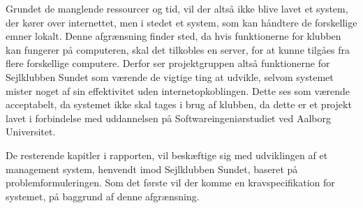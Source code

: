 Grundet de manglende ressourcer og tid, vil der altså ikke blive lavet et system, der kører over internettet, men i stedet et system, som kan håndtere de forskellige emner lokalt. 
Denne afgrænsning finder sted, da hvis funktionerne for klubben kan fungerer på computeren, skal det tilkobles en server, for at kunne tilgåes fra flere forskellige computere. 
Derfor ser projektgruppen altså funktionerne for Sejlklubben Sundet som værende de vigtige ting at udvikle, selvom systemet mister noget af sin effektivitet uden internetopkoblingen.
Dette ses som værende acceptabelt, da systemet ikke skal tages i brug af klubben, da dette er et projekt lavet i forbindelse med uddannelsen på Softwareingeniørstudiet ved Aalborg Universitet.

De resterende kapitler i rapporten, vil beskæftige sig med udviklingen af et management system, henvendt imod Sejlklubben Sundet, baseret på problemformuleringen. 
Som det første vil der komme en kravspecifikation for systemet, på baggrund af denne afgrænsning.
